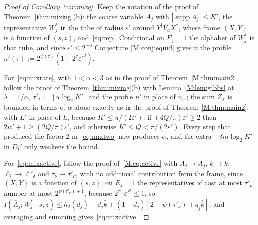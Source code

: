 \documentclass[aps,prx,twocolumn,superscriptaddress,nofootinbib,longbibliography]{revtex4-2}
\theoremstyle{plain}
\theoremstyle{definition}
\theoremstyle{remark}
\newcommand{\supp}{\operatorname{supp}}
\begin{document}
\begin{proof}[Proof of Corollary~\ref{cor:mixq}]
Keep the notation of the proof of Theorem~\ref{thm:mixing}(b): the coarse variable $\bar A_j$ with $|\supp\bar A_j|\le K'$, the representative $W^*_j$ in the tube of radius $\varepsilon'$ around $Y^\dagger V_aX^\dagger$, whose frame $(X,Y)$ is a function of $(s,z)$, and~\eqref{eq:rep}. Conditional on $E_j=1$ the alphabet of $W^*_j$ is that tube, and since $\varepsilon'\le2^{-6}$ Conjecture~\ref{M:conj:equid} gives it the profile $n'(\tau):=2^{\psi(\tau)}(1+2^\tau\varepsilon'^2)$. 

For~\eqref{eq:mixrate}, with $1<\alpha<3$ as in the proof of Theorem~\ref{M:thm:main2}, follow the proof of Theorem~\ref{thm:mixing}(b) with Lemma~\ref{M:lem:gibbs} at $\lambda=1/\alpha$, $\tau'_*:=\lceil\alpha\log_2K'\rceil$ and the profile $n'$ in place of $n_{\varepsilon'}$; the sum $Z_\lambda$ is bounded in terms of $\alpha$ alone exactly as in the proof of Theorem~\ref{M:thm:main2}, with $L'$ in place of $L$, because $K'\le\pi/(2\varepsilon')$: if $(4Q/\pi)\varepsilon'\ge2$ then $2w'+1\ge(2Q/\pi)\varepsilon'$, and otherwise $K'\le Q<\pi/(2\varepsilon')$. Every step that produced the factor $2$ in~\eqref{eq:mixtwo} now produces $\alpha$, and the extra $-\delta m\log_2K'$ in $D_t'$ only weakens the bound. 

For~\eqref{eq:mixactive}, follow the proof of~\eqref{M:eq:active} with $A_j\to\bar A_j$, $k\to\bar k$, $\ell_\delta\to\ell'_\delta$ and $\tau_\nu\to\tau'_\nu$, with no additional contribution from the frame, since $(X,Y)$ is a function of $(s,z)$: on $E_j=1$ the representatives of cost at most $\tau'_\nu$ number at most $2^{\psi(\tau'_\nu)+1}$, because $2^{\tau'_\nu}\varepsilon'^2\le1$, so $I(\bar A_j;W^*_j\mid s,z)\le h_2(d_j)+d_j\bar k+(1-d_j)[2+\psi(\tau'_\nu)+q_j\bar k]$, and averaging and summing gives~\eqref{eq:mixactive}.
\end{proof}
\end{document}
